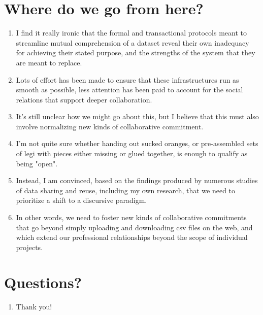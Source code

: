 \documentclass[12pt]{article}
\begin{document}
\section{Where do we go from here?}
\begin{enumerate}
  \item I find it really ironic that the formal and transactional protocols meant to streamline mutual comprehension of a dataset reveal their own inadequacy for achieving their stated purpose, and the strengths of the system that they are meant to replace.
  \item Lots of effort has been made to ensure that these infrastructures run as smooth as possible, less attention has been paid to account for the social relations that support deeper collaboration.
  \item It's still unclear how we might go about this, but I believe that this must also involve normalizing new kinds of collaborative commitment.
  \item I'm not quite sure whether handing out sucked oranges, or pre-assembled sets of legi with pieces either missing or glued together, is enough to qualify as being "open".
  \item Instead, I am convinced, based on the findings produced by numerous studies of data sharing and reuse, including my own research, that we need to prioritize a shift to a discursive paradigm.
  \item In other words, we need to foster new kinds of collaborative commitments that go beyond simply uploading and downloading csv files on the web, and which extend our professional relationships beyond the scope of individual projects.
\end{enumerate}

\section{Questions?}
\begin{enumerate}
  \item Thank you!
\end{enumerate}
\end{document}
